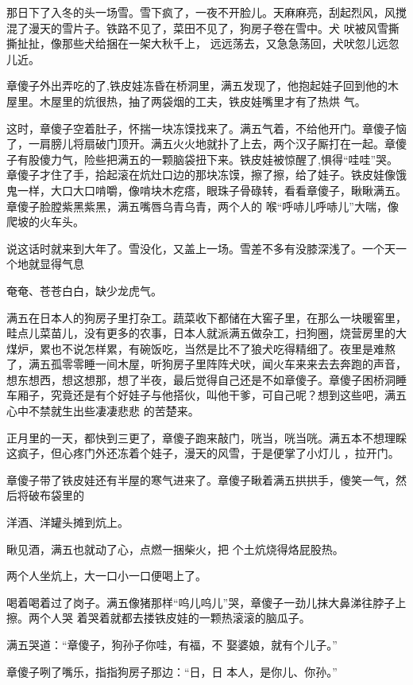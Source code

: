 \documentclass{article}
\begin{document}
那日下了入冬的头一场雪。雪下疯了，一夜不开脸儿。天麻麻亮，刮起烈风，风搅混了漫天的雪片子。铁路不见了，菜田不见了，狗房子卷在雪中。犬
\newpage
吠被风雪撕撕扯扯，像那些犬给捆在一架大秋千上，
远远荡去，又急急荡回，犬吠忽儿远忽儿近。 

章傻子外出弄吃的了,铁皮娃冻昏在桥洞里，满五发现了，他抱起娃子回到他的木屋里。木屋里的炕很热，抽了两袋烟的工夫，铁皮娃嘴里才有了热烘
气。 

这时，章傻子空着肚子，怀揣一块冻馍找来了。满五气着，不给他开门。章傻子恼了，一肩膀儿将扇破门顶开。满五火火地就扑了上去，两个汉子厮打在一起。章傻子有股傻力气，险些把满五的一颗脑袋扭下来。铁皮娃被惊醒了,惧得“哇哇”哭。章傻子才住了手，拾起滚在炕灶口边的那块冻馍，擦了擦，给了娃子。铁皮娃像饿鬼一样，大口大口啃嚼，像啃块木疙瘩，眼珠子骨碌转，看看章傻子，瞅瞅满五。章傻子脸膛紫黑紫黑，满五嘴唇乌青乌青，两个人的
喉“呼哧儿呼哧儿”大喘，像爬坡的火车头。 

说这话时就来到大年了。雪没化，又盖上一场。雪差不多有没膝深浅了。一个天一个地就显得气息
\newpage

奄奄、苍苍白白，缺少龙虎气。 

满五在日本人的狗房子里打杂工。蔬菜收下都储在大窖子里，在那么一块暖窖里，畦点儿菜苗儿，没有更多的农事，日本人就派满五做杂工，扫狗圈，烧营房里的大煤炉，累也不说怎样累，有碗饭吃，当然是比不了狼犬吃得精细了。夜里是难熬了，满五孤零零睡一间木屋，听狗房子里阵阵犬吠，闻火车来来去去奔跑的声音，想东想西，想这想那，想了半夜，最后觉得自己还是不如章傻子。章傻子困桥洞睡车厢子，究竟还是有个好娃子与他搭伙，叫他干爹，可自己呢？想到这些吧，满五心中不禁就生出些凄凄悲悲
的苦楚来。 

正月里的一天，都快到三更了，章傻子跑来敲门，咣当，咣当咣。满五本不想理睬这疯子，但心疼门外还冻着个娃子，漫天的风雪，于是便掌了小灯儿
，拉开门。 

章傻子带了铁皮娃还有半屋的寒气进来了。章傻子瞅着满五拱拱手，傻笑一气，然后将破布袋里的
\newpage

洋酒、洋罐头摊到炕上。 

瞅见酒，满五也就动了心，点燃一捆柴火，把
个土炕烧得烙屁股热。 


两个人坐炕上，大一口小一口便喝上了。 

喝着喝着过了岗子。满五像猪那样“呜儿呜儿”哭，章傻子一劲儿抹大鼻涕往脖子上擦。两个人哭
着哭着就都去搂铁皮娃的一颗热滚滚的脑瓜子。 

满五哭道：“章傻子，狗孙子你哇，有福，不
娶婆娘，就有个儿子。” 

章傻子咧了嘴乐，指指狗房子那边：“日，日
本人，是你儿、你孙。” 
\end{document}
